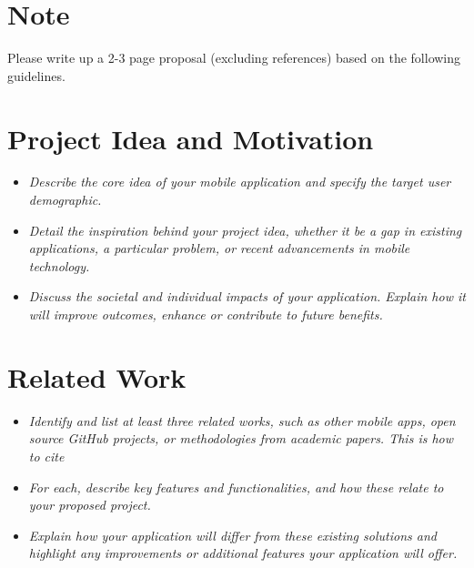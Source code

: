 \documentclass[11pt,twoside,a4paper]{article}
\begin{document}




\section*{Note}
Please write up a 2-3 page proposal (excluding references) based on the following guidelines. 

\section{Project Idea and Motivation}
\begin{itemize}
    \item \emph{Describe the core idea of your mobile application and specify the target user demographic.}
    \item \emph{Detail the inspiration behind your project idea, whether it be a gap in existing applications, a particular problem, or recent advancements in mobile technology.}
    \item \emph{Discuss the societal and individual impacts of your application. Explain how it will improve outcomes, enhance  or contribute to future benefits.}
\end{itemize}

\section{Related Work}
\begin{itemize}
    \item \emph{Identify and list at least three related works, such as other mobile apps, open source GitHub projects, or methodologies from academic papers. This is how to cite \cite{Lohse2003}}
    \item \emph{For each, describe key features and functionalities, and how these relate to your proposed project.}
    \item \emph{Explain how your application will differ from these existing solutions and highlight any improvements or additional features your application will offer.}
\end{itemize}
\end{document}
